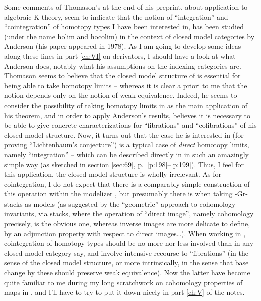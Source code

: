 Some comments of Thomason's at the end of his preprint, about
application to algebraic K-theory, seem to indicate that the notion of
``integration'' and ``cointegration'' of homotopy types I have been
interested in, has been studied (under the name holim and hocolim) in
the context of closed model categories by Anderson (his paper appeared
in 1978). As I am going to develop
some ideas along these lines in part \ref{ch:VI} on derivators, I
should have a look at what Anderson does, notably what his
assumptions on the indexing categories are. Thomason seems to believe
that the closed model structure of \Cat{} is essential for being able
to take homotopy limits -- whereas it is clear a priori to me that the
notion depends only on the notion of weak equivalence. Indeed, he
seems to consider the possibility of taking homotopy limits in \Cat{}
as the main application of his theorem, and in order to apply
Anderson's results, believes it is necessary to be able to give
concrete characterizations for ``fibrations'' and ``cofibrations'' of
his closed model structure. Now, it turns out that the case he is
interested in (for proving ``Lichtenbaum's
conjecture'') is a typical
case of \emph{direct} homotopy limits, namely ``integration'' -- which
can be described directly in \Cat{} in such an amazingly simple way
(as sketched in section \ref{sec:69}, p.\
\ref{p:198}--\ref{p:199}). Thus, I feel for this application, the
closed model structure is wholly irrelevant. As for cointegration, I
do not expect that there is a comparably simple construction of this
operation within the modelizer \Cat, but presumably there is when
taking \oo-Gr-stacks as models (as suggested by the ``geometric''
approach to cohomology invariants, via stacks, where the operation of
``direct image'', namely cohomology precisely, is the obvious one,
whereas inverse images are more delicate to define, by an adjunction
property with respect to direct images\ldots). When working in \Cat,
cointegration of homotopy types should be no more nor less involved
than in any closed model category say, and involve intensive recourse
to ``fibrations'' (in the sense of the closed model structure, or more
intrinsically, in the sense that base change by these should preserve
weak equivalence). Now the latter have become quite familiar to me
during my long scratchwork on cohomology properties of maps in \Cat,
and I'll have to try to put it down nicely in part \ref{ch:V} of the
notes.

